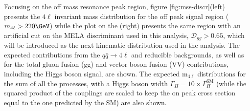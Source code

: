 Focusing on the off mass resonance peak region, figure \ref{fig:mss-discr}(left) presents the $4\ell$ invariant mass distribution
for the off peak signal region ($m_{4\ell} > 220\GeV$) while the plot on the (right) presents the same region with an artificial cut on the MELA discriminant used in this analysis, $\mathcal{D}_{gg} > 0.65$, which will be introduced as the next kinematic distribution used in the analysis.
The expected contributions from the $q\bar{q} \to 4\ell$ and reducible backgrounds,
as well as for the total gluon fusion (gg) and vector boson fusion (VV) contributions, including the
Higgs boson signal, are shown. The expected m$_{4\ell}$ distributions for the sum of all the
processes, with a Higgs boson width $\Gamma_{H} = 10 \times \Gamma_{H}^{\mathrm{SM}}$ (while the squared product of the couplings are scaled to keep the on peak cross section equal to the one predicted by the SM) are also shown. 

